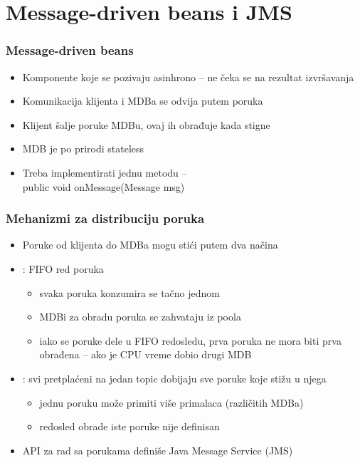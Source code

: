 \documentclass[compress]{beamer}
\begin{document}
\section[MDB]{Message-driven beans i JMS}
\begin{frame}
  \frametitle{Message-driven beans}
  \begin{itemize}
    \item Komponente koje se pozivaju asinhrono -- ne čeka se na rezultat izvršavanja
    \item Komunikacija klijenta i MDBa se odvija putem poruka
    \item Klijent šalje poruke MDBu, ovaj ih obrađuje kada stigne
  \end{itemize}

  \begin{itemize}
    \item MDB je po prirodi stateless
    \item Treba implementirati jednu metodu -- \\ public void onMessage(Message msg)
  \end{itemize}
\end{frame}
\begin{frame}
  \frametitle{Mehanizmi za distribuciju poruka}
  \begin{itemize}
    \item Poruke od klijenta do MDBa mogu stići putem dva načina
    \item {}: FIFO red poruka
    \begin{itemize}
      \item svaka poruka konzumira se tačno jednom
      \item MDBi za obradu poruka se zahvataju iz poola
      \item iako se poruke dele u FIFO redosledu, prva poruka ne mora biti prva obrađena -- ako je CPU vreme dobio drugi MDB
    \end{itemize}
  \end{itemize}
  
  \begin{itemize}
    \item {}: svi pretplaćeni na jedan topic dobijaju sve poruke koje stižu u njega
    \begin{itemize}
      \item jednu poruku može primiti više primalaca (različitih MDBa)
      \item redosled obrade iste poruke nije definisan
    \end{itemize}
  \end{itemize}

  \begin{itemize}
    \item API za rad sa porukama definiše Java Message Service (JMS)
  \end{itemize}
\end{frame}
\end{document}
